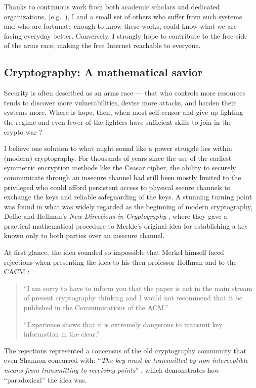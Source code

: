 \documentclass{article}
\begin{document}
Thanks to continuous work from both academic scholars and dedicated
organizations, (e.g.\ \cite{data.analysis.1, data.analysis.2, censor.block.6}),
I and a small set of others who suffer from such systems and who are fortunate
enough to know these works, could know what we are facing everyday better.
Conversely, I strongly hope to contribute to the free-side of the arms race,
making the free Internet reachable to everyone.

\subsection{Cryptography: A mathematical savior} \label{sec.crypto}
Security is often described as an arms race --- that who controls more
resources tends to discover more vulnerabilities, devise more attacks, and
harden their systems more. Where is hope, then, when most self-censor and give
up fighting the regime \cite{self.censor.1, self.censor.2, self.censor.3}  and
even fewer of the fighters have sufficient skills to join in the crypto war
\cite{defenders.lack.skills.1, defenders.lack.skills.2}?

I believe one solution to what might sound like a power struggle lies within
(modern) cryptography. For thousands of years since the use of the earliest
symmetric encryption methods like the Ceasar cipher, the ability to securely
communicate through an insecure channel had still been mostly limited to the
privileged who could afford persistent access to physical secure channels to
exchange the keys and reliable safeguarding of the keys.  A stunning turning
point was found in what was widely regarded as the beginning of modern
cryptography, Deffie and Hellman's \emph{New Directions in Cryptography}
\cite{new.directions.crypto}, where they gave a practical mathematical
procedure to Merkle's original idea for establishing a key known only to both
parties over an insecure channel.

At first glance, the idea sounded so impossible that Merkel himself faced 
rejections when presenting the idea to his then professor Hoffman and to the
CACM \cite{merkle.rejection}:
\begin{quotation}
	``I am sorry to have to inform you that the paper is not in the main stream
	of present cryptography thinking and I would not recommend that it be
	published in the Communications of the ACM.''

	``Experience shows that it is extremely dangerous to transmit key
	information in the clear.''\cite{merkle.rejection}
\end{quotation}
The rejections represented a concensus of the old cryptography community that
even Shannon concurred with: ``\emph{The key must be transmitted by
non-interceptible means from transmitting to receiving points}''
\cite[p.~670]{shannon.theory.secrecy}, which demonstrates how ``paradoxical''
the idea was.
\end{document}
